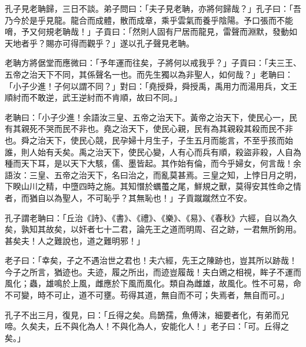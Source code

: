 \begin{pinyinscope}
孔子見老聃歸，三日不談。弟子問曰：「夫子見老聃，亦將何歸哉？」孔子曰：「吾乃今於是乎見龍。龍合而成體，散而成章，乘乎雲氣而養乎陰陽。予口張而不能嗋，予又何規老聃哉！」子貢曰：「然則人固有尸居而龍見，雷聲而淵默，發動如天地者乎？賜亦可得而觀乎？」遂以孔子聲見老聃。

老聃方將倨堂而應微曰：「予年運而往矣，子將何以戒我乎？」子貢曰：「夫三王、五帝之治天下不同，其係聲名一也。而先生獨以為非聖人，如何哉？」老聃曰：「小子少進！子何以謂不同？」對曰：「堯授舜，舜授禹，禹用力而湯用兵，文王順紂而不敢逆，武王逆紂而不肯順，故曰不同。」

老聃曰：「小子少進！余語汝三皇、五帝之治天下。黃帝之治天下，使民心一，民有其親死不哭而民不非也。堯之治天下，使民心親，民有為其親殺其殺而民不非也。舜之治天下，使民心競，民孕婦十月生子，子生五月而能言，不至乎孩而始誰，則人始有夭矣。禹之治天下，使民心變，人有心而兵有順，殺盜非殺，人自為種而天下耳，是以天下大駭，儒、墨皆起。其作始有倫，而今乎婦女，何言哉！余語汝：三皇、五帝之治天下，名曰治之，而亂莫甚焉。三皇之知，上悖日月之明，下睽山川之精，中墮四時之施。其知憯於蠣蠆之尾，鮮規之獸，莫得安其性命之情者，而猶自以為聖人，不可恥乎？其無恥也！」子貢蹴蹴然立不安。

孔子謂老聃曰：「丘治《詩》、《書》、《禮》、《樂》、《易》、《春秋》六經，自以為久矣，孰知其故矣，以奸者七十二君，論先王之道而明周、召之跡，一君無所鉤用。甚矣夫！人之難說也，道之難明邪！」

老子曰：「幸矣，子之不遇治世之君也！夫六經，先王之陳跡也，豈其所以跡哉！今子之所言，猶迹也。夫迹，履之所出，而迹豈履哉！夫白鶂之相視，眸子不運而風化；蟲，雄鳴於上風，雌應於下風而風化。類自為雌雄，故風化。性不可易，命不可變，時不可止，道不可壅。苟得其道，無自而不可；失焉者，無自而可。」

孔子不出三月，復見，曰：「丘得之矣。烏鵲孺，魚傅沫，細要者化，有弟而兄啼。久矣夫，丘不與化為人！不與化為人，安能化人！」老子曰：「可。丘得之矣。」


\end{pinyinscope}